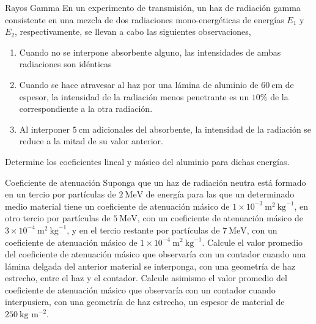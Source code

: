
\begin{Ejercicio}{Rayos Gamma}
En un experimento de transmisión, un haz de radiación gamma consistente en una mezcla de dos radiaciones mono-energéticas de energías $E_{1}$ y $E_{2}$, respectivamente, se llevan a cabo las siguientes observaciones,

\begin{enumerate}[label=\alph*)]
\item Cuando no se interpone absorbente alguno, las intensidades de ambas radiaciones son idénticas
\item Cuando se hace atravesar al haz por una lámina de aluminio de $60\ \text{cm}$ de espesor, la intensidad de la radiación menos penetrante es un $10\%$ de la correspondiente a la otra radiación.
\item Al interponer $5\ \text{cm}$ adicionales del absorbente, la intensidad de la radiación se reduce a la mitad de su valor anterior.
\end{enumerate}

Determine los coeficientes lineal y másico del aluminio para dichas energías.
\end{Ejercicio}


\begin{Ejercicio}{Coeficiente de atenuación }
Suponga que un haz de radiación neutra está formado en un tercio por partículas de $2\ \text{MeV}$ de energía para las que un determinado medio material tiene un coeficiente de atenuación másico de $1 \times 10^{-3}\ \text{m}^2\ \text{kg}^{-1}$, en otro tercio por partículas de $5\ \text{MeV}$, con un coeficiente de atenuación másico de $3 \times 10^{-4}\ \text{m}^2\ \text{kg}^{-1}$, y en el tercio restante por partículas de $7\ \text{MeV}$, con un coeficiente de atenuación másico de $1 \times 10^{-4}\ \text{m}^2\ \text{kg}^{-1}$. Calcule el valor promedio del coeficiente de atenuación másico que observaría con un contador cuando una lámina delgada del anterior material se interponga, con una geometría de haz estrecho, entre el haz y el contador. Calcule asimismo el valor promedio del coeficiente de atenuación másico que observaría con un contador cuando interpusiera, con una geometría de haz estrecho, un espesor de material de $250\ \text{kg m}^{-2}$.
\end{Ejercicio}
